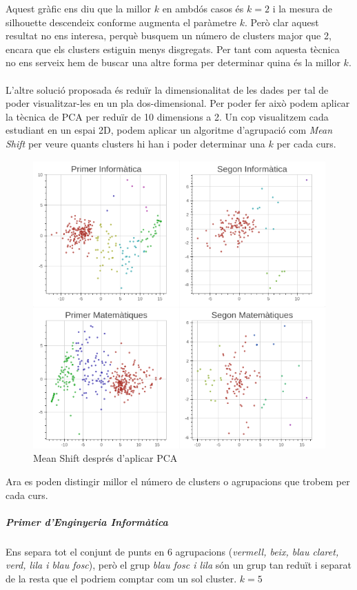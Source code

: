 \documentclass[12pt,a4paper,catalan]{article}
\begin{document}
Aquest gràfic ens diu que la millor $k$ en ambdós casos és $k=2$ i la mesura de silhouette descendeix conforme augmenta el paràmetre $k$. Però clar aquest resultat no ens interesa, perquè busquem un número de clusters major que 2, encara que els clusters estiguin menys disgregats. Per tant com aquesta tècnica no ens serveix hem de buscar una altre forma per determinar quina és la millor $k$.
\\
\\
L'altre solució proposada és reduïr la dimensionalitat de les dades per tal de poder visualitzar-les en un pla dos-dimensional. Per poder fer això podem aplicar la tècnica de PCA per reduïr de 10 dimensions a 2. Un cop visualitzem cada estudiant en un espai 2D, podem aplicar un algoritme d'agrupació com \textit{Mean Shift} per veure quants clusters hi han i poder determinar una $k$ per cada curs.

\begin{figure}[h]
\centering
\includegraphics[width=\linewidth]{img/pca_info_mates.png}
\caption{Mean Shift després d'aplicar PCA}
\end{figure}

\newpage

Ara es poden distingir millor el número de clusters o agrupacions que trobem per cada curs.

\subparagraph{Primer d'Enginyeria Informàtica}
Ens separa tot el conjunt de punts en 6 agrupacions (\textit{vermell, beix, blau claret, verd, lila i blau fosc}), però el grup \textit{blau fosc i lila} són un grup tan reduït i separat de la resta que el podriem comptar com un sol cluster. $k=5$
\end{document}

